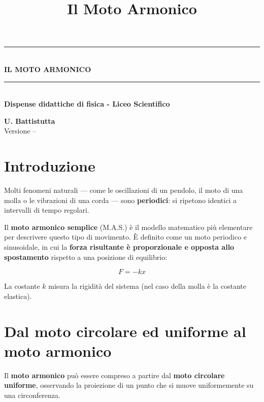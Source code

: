 \documentclass[a4paper,12pt]{article}
\title{\textbf{Il Moto Armonico}}
\begin{document}
\onehalfspacing
\begin{titlepage}
    \centering
    \vspace*{3cm}
    \rule{\textwidth}{0.6pt}\\[1.2em]
    {\Huge \textbf{IL MOTO ARMONICO}}\\[0.8em]
    \rule{\textwidth}{0.6pt}\\[4cm]

    {\Large \textbf{Dispense didattiche di fisica - Liceo Scientifico}}\\[10cm]
\begin{flushright}
    \textbf{U. Battistutta}\\[0.4cm]
    Versione -- \DTMmonthname{\month} \the\year
\end{flushright}
\end{titlepage}

\maketitle
\tableofcontents
\newpage

\section{Introduzione}

Molti fenomeni naturali — come le oscillazioni di un pendolo, il moto di una molla o le vibrazioni di una corda — sono \textbf{periodici}: si ripetono identici a intervalli di tempo regolari.

Il \textbf{moto armonico semplice} (M.A.S.) è il modello matematico più elementare per descrivere questo tipo di movimento. È definito come un moto periodico e sinusoidale, in cui la \textbf{forza risultante è proporzionale e opposta allo spostamento} rispetto a una posizione di equilibrio:

\[
F = -k x
\]

La costante \( k \) misura la rigidità del sistema (nel caso della molla è la costante elastica).

\section{Dal moto circolare ed uniforme al moto armonico}

Il \textbf{moto armonico} può essere compreso a partire dal \textbf{moto circolare uniforme}, osservando la proiezione di un punto che si muove uniformemente su una circonferenza.
\end{document}
